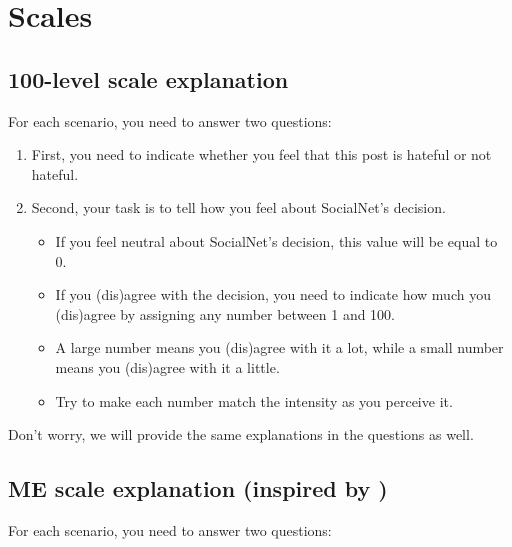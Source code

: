 \section{Scales}
\subsection{100-level scale explanation}
For each scenario, you need to answer two questions:
\begin{enumerate}
    \item First, you need to indicate whether you feel that this post is hateful or not hateful.
    \item Second, your task is to tell how you feel about SocialNet's decision.
          \begin{itemize}
              \item If you feel neutral about SocialNet's decision, this value will be equal to 0.
              \item If you (dis)agree with the decision, you need to indicate how much you (dis)agree by assigning any number between 1 and 100.
              \item A large number means you (dis)agree with it a lot, while a small number means you (dis)agree with it a little.
              \item Try to make each number match the intensity as you perceive it.
          \end{itemize}
\end{enumerate}

\begin{flushleft}
    Don't worry, we will provide the same explanations in the questions as well.
\end{flushleft}

\subsection{ME scale explanation (inspired by \citet{moskowitz1977magnitude})}
For each scenario, you need to answer two questions:

